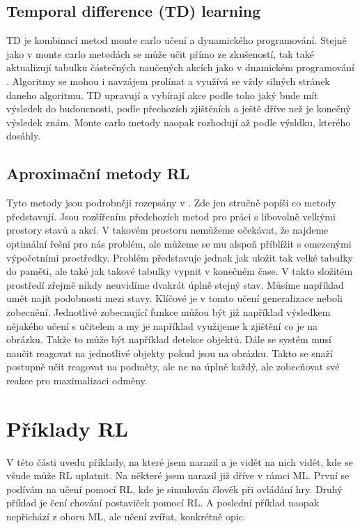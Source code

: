 \documentclass{article}
\begin{document}
\subsection{Temporal difference (TD) learning}
TD je kombinací metod monte carlo učení a dynamického programování. Stejně jako v monte carlo metodách se může učit přímo ze zkušeností, tak také aktualizují tabulku částečných naučených akcích jako v dnamickém programování \cite{sutton1998introduction}. Algoritmy se mohou i navzájem prolínat a využívá se vždy silných stránek daneho algoritmu. TD upravují a vybírají akce podle toho jaký bude mít výsledek do budoucnosti, podle přechozích zjištěních a ještě dříve než je konečný výsledek znám. Monte carlo metody naopak rozhodují až podle výsldku, kterého dosáhly.


\subsection{Aproximační metody RL}

Tyto metody jsou podrobněji rozepsány v \cite{sutton1998introduction}. Zde jen stručně popíši co metody představují. Jsou rozšířením předchozích metod pro práci s libovolně velkými prostory stavů a akcí. V takovém prostoru nemůžeme očekávat, že najdeme optimální řešní pro nás problém, ale můžeme se mu alspoň příblížit s omezenými výpočetními prostředky. Problém představuje jednak jak uložit tak velké tabulky do paměti, ale také jak takové tabulky vypnit v konečném čase. V takto složitém prostředí zřejmě nikdy neuvidíme dvakrát úplně stejný stav. Můsíme například umět najít podobnosti mezi stavy. Klíčové je v tomto učení generalizace neboli zobecnění. Jednotlivé zobecnující funkce můžou být již například výsledkem nějakého učení s učitelem a my je například využijeme k zjištění co je na obrázku. Takže to může být například detekce objektů. Dále se systém musí naučit reagovat na jednotlivé objekty pokud jsou na obrázku. Takto se snaží postupně učit reagovat na podměty, ale ne na úplně každý, ale zobecňovat své reakce pro maximalizaci odměny. 


\section{Příklady RL}
\label{sec:priklady}
V této části uvedu příklady, na které jsem narazil a je vidět na nich vidět, kde se všude může RL uplatnit. Na některé jsem narazil již dříve v rámci ML. První se podívám na učení pomocí RL, kde je simulován člověk při ovládání hry. Druhý příklad je čení chování postaviček pomocí RL. A poslední příklad naopak nepřichází z oboru ML, ale učení zvířat, konkrétně opic.
\end{document}

